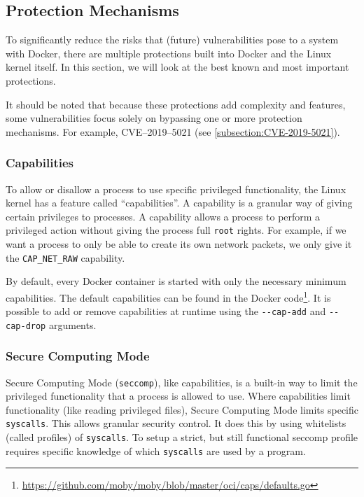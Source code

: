\subsection{Protection Mechanisms}
To significantly reduce the risks that (future) vulnerabilities pose to a system with Docker, there are multiple protections built into Docker and the Linux kernel itself. In this section, we will look at the best known and most important protections.

\medskip

It should be noted that because these protections add complexity and features, some vulnerabilities focus solely on bypassing one or more protection mechanisms. For example, CVE--2019--5021 (see \autoref{subsection:CVE-2019-5021}).

\subsubsection{Capabilities}\label{protection-mechanisms:subsection:capabilities}
To allow or disallow a process to use specific privileged functionality, the Linux kernel has a feature called ``capabilities''. A capability is a granular way of giving certain privileges to processes. A capability allows a process to perform a privileged action without giving the process full \lstinline{root} rights. For example, if we want a process to only be able to create its own network packets, we only give it the \lstinline{CAP_NET_RAW} capability.

\medskip

By default, every Docker container is started with only the necessary minimum capabilities. The default capabilities can be found in the Docker code\footnote{\url{https://github.com/moby/moby/blob/master/oci/caps/defaults.go}}. It is possible to add or remove capabilities at runtime using the \lstinline{--cap-add} and \lstinline{--cap-drop}\cite{More-Secure-Non-Root-Container} arguments.

\subsubsection{Secure Computing Mode}
Secure Computing Mode (\lstinline{seccomp}), like capabilities, is a built-in way to limit the privileged functionality that a process is allowed to use. Where capabilities limit functionality (like reading privileged files), Secure Computing Mode limits specific \lstinline{syscalls}. This allows granular security control. It does this by using whitelists (called profiles) of \lstinline{syscalls}.
To setup a strict, but still functional seccomp profile requires specific knowledge of which \lstinline{syscalls} are used by a program.


